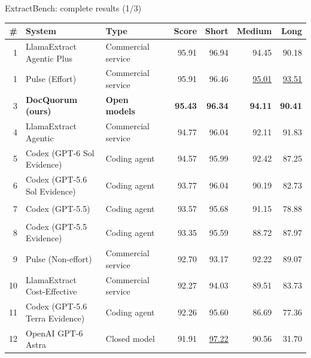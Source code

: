 \documentclass[aspectratio=169,10pt]{beamer}
\begin{document}
\begin{frame}{ExtractBench: complete results (1/3)}
\begingroup\scriptsize\renewcommand{\arraystretch}{1.02}\setlength{\tabcolsep}{4pt}
\begin{tabularx}{\textwidth}{@{}rYl@{\hspace{6pt}}lrrrr@{}}\toprule
\textbf{\#} & \textbf{System} & \textbf{Type} &  & \textbf{Score} & \textbf{Short} & \textbf{Medium} & \textbf{Long}\\ & LlamaExtract Agentic Plus & {\color{routeB}Commercial service} & \textcolor{routeB!45}{\rule{1.15cm}{1.05ex}} & 95.91 & 96.94 & 94.45 & 90.18\\
1 & Pulse (Effort) & {\color{routeB}Commercial service} & \textcolor{routeB!45}{\rule{1.15cm}{1.05ex}} & 95.91 & 96.46 & \underline{95.01} & \underline{93.51}\\
3 & \textbf{DocQuorum (ours)} & {\color{good}\textbf{Open models}} & \textcolor{good}{\rule{1.15cm}{1.05ex}} & \textbf{95.43} & \textbf{96.34} & \textbf{94.11} & \textbf{90.41}\\
4 & LlamaExtract Agentic & {\color{routeB}Commercial service} & \textcolor{routeB!45}{\rule{1.14cm}{1.05ex}} & 94.77 & 96.04 & 92.11 & 91.83\\
5 & Codex (GPT-6 Sol Evidence) & {\color{routeD}Coding agent} & \textcolor{routeD!45}{\rule{1.13cm}{1.05ex}} & 94.57 & 95.99 & 92.42 & 87.25\\
6 & Codex (GPT-5.6 Sol Evidence) & {\color{routeD}Coding agent} & \textcolor{routeD!45}{\rule{1.13cm}{1.05ex}} & 93.77 & 96.04 & 90.19 & 82.73\\
7 & Codex (GPT-5.5) & {\color{routeD}Coding agent} & \textcolor{routeD!45}{\rule{1.12cm}{1.05ex}} & 93.57 & 95.68 & 91.15 & 78.88\\
8 & Codex (GPT-5.5 Evidence) & {\color{routeD}Coding agent} & \textcolor{routeD!45}{\rule{1.12cm}{1.05ex}} & 93.35 & 95.59 & 88.72 & 87.97\\
9 & Pulse (Non-effort) & {\color{routeB}Commercial service} & \textcolor{routeB!45}{\rule{1.11cm}{1.05ex}} & 92.70 & 93.17 & 92.22 & 89.07\\
10 & LlamaExtract Cost-Effective & {\color{routeB}Commercial service} & \textcolor{routeB!45}{\rule{1.11cm}{1.05ex}} & 92.27 & 94.03 & 89.51 & 83.73\\
11 & Codex (GPT-5.6 Terra Evidence) & {\color{routeD}Coding agent} & \textcolor{routeD!45}{\rule{1.11cm}{1.05ex}} & 92.26 & 95.60 & 86.69 & 77.36\\
12 & OpenAI GPT-6 Astra & {\color{muted}Closed model} & \textcolor{muted!45}{\rule{1.10cm}{1.05ex}} & 91.91 & \underline{97.22} & 90.56 & 31.70\\

\end{tabularx}
\end{frame}
\end{document}
